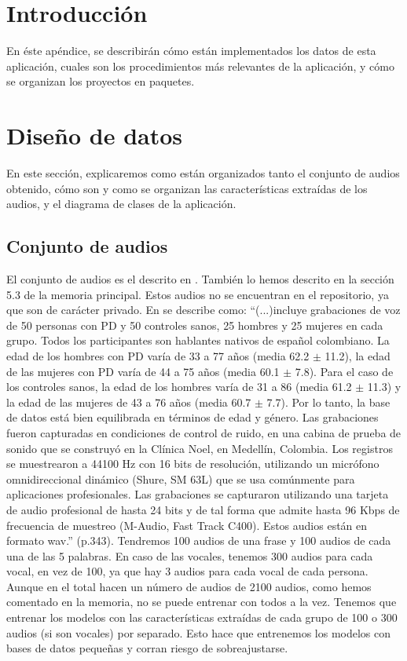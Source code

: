 
\section{Introducción}
En éste apéndice, se describirán cómo están implementados los datos de esta aplicación, cuales son los procedimientos más relevantes de la aplicación, y cómo se organizan los proyectos en paquetes.

\section{Diseño de datos}
En este sección, explicaremos como están organizados tanto el conjunto de audios obtenido, cómo son y como se organizan las características extraídas de los audios, y el diagrama de clases de la aplicación.

\subsection{Conjunto de audios}
El conjunto de audios es el descrito en \cite{OrzCorpus}. También lo hemos descrito en la sección 5.3 de la memoria principal. Estos audios no se encuentran en el repositorio, ya que son de carácter privado. En \cite{OrzCorpus} se describe como: ``(...)incluye grabaciones de voz de 50 personas con PD y 50 controles sanos, 25 hombres y 25 mujeres en cada grupo. Todos los participantes son hablantes nativos de español colombiano. La edad de los hombres con PD varía de 33 a 77 años (media 62.2 $\pm$ 11.2), la edad de las mujeres con PD varía de 44 a 75 años (media 60.1 $\pm$ 7.8). Para el caso de los controles sanos, la edad de los hombres varía de 31 a 86 (media 61.2 $\pm$ 11.3) y la edad de las mujeres de 43 a 76 años (media 60.7 $\pm$ 7.7). Por lo tanto, la base de datos está bien equilibrada en términos de edad y género. Las grabaciones fueron capturadas en condiciones de control de ruido, en una cabina de prueba de sonido que se construyó en la Clínica Noel, en Medellín, Colombia. Los registros se muestrearon a 44100 Hz con 16 bits de resolución, utilizando un micrófono omnidireccional dinámico (Shure, SM 63L) que se usa comúnmente para aplicaciones profesionales. Las grabaciones se capturaron utilizando una tarjeta de audio profesional de hasta 24 bits y de tal forma que admite hasta 96 Kbps de frecuencia de muestreo (M-Audio, Fast Track C400). Estos audios están en formato wav.'' (p.343). Tendremos 100 audios de una frase y 100 audios de cada una de las 5 palabras. En caso de las vocales, tenemos 300 audios para cada vocal, en vez de 100, ya que hay 3 audios para cada vocal de cada persona. Aunque en el total hacen un número de audios de 2100 audios, como hemos comentado en la memoria, no se puede entrenar con todos a la vez. Tenemos que entrenar los modelos con las características extraídas de cada grupo de 100 o 300 audios (si son vocales) por separado. Esto hace que entrenemos los modelos con bases de datos pequeñas y corran riesgo de sobreajustarse.

